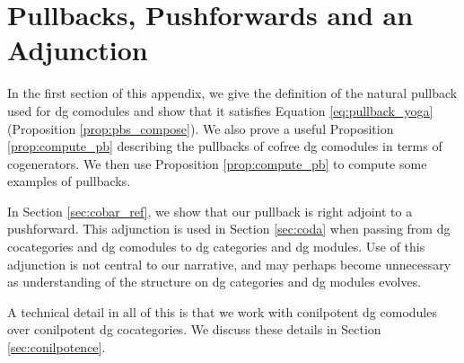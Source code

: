 \chapter{Pullbacks, Pushforwards and an Adjunction} \label{chap:pullbacks}
%
In the first section of this appendix, 
we give the definition 
of the natural pullback used for dg 
comodules and show that it satisfies 
Equation \ref{eq:pullback_yoga} 
(Proposition \ref{prop:pbs_compose}). We also prove 
a useful Proposition \ref{prop:compute_pb}
describing the pullbacks of cofree dg 
comodules in terms of cogenerators. 
We then use Proposition \ref{prop:compute_pb}
to compute some examples of pullbacks.

In Section \ref{sec:cobar_ref}, we show that our 
pullback is right adjoint to a  
pushforward. This adjunction is used in 
Section \ref{sec:coda} when passing from 
dg cocategories and dg comodules to dg 
categories and dg modules. Use of this 
adjunction is not central to our 
narrative, and may perhaps become 
unnecessary as understanding of the 
structure on dg categories and dg modules 
evolves.

A technical detail in all of this is that 
we work with conilpotent dg comodules over 
conilpotent dg cocategories. We discuss these 
details in Section \ref{sec:conilpotence}.
%


